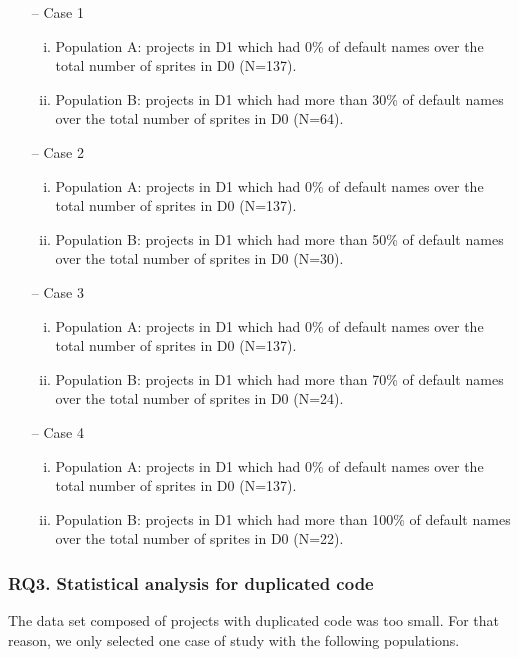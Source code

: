 \begin{itemize}
    \item[--] Case 1
    \begin{enumerate}[(i)]
        \item Population A: projects in D1 which had 0\% of default names over the total number of sprites in D0 (N=137).
        \item Population B: projects in D1 which had more than 30\% of default names over the total number of sprites  in D0 (N=64).
    \end{enumerate}
    \item[--] Case 2
    \begin{enumerate}[(i)]
        \item Population A: projects in D1 which had 0\% of default names over the total number of sprites in D0 (N=137).
        \item Population B: projects in D1 which had more than 50\% of default names over the total number of sprites  in D0 (N=30).
    \end{enumerate}
    \item[--] Case 3
    \begin{enumerate}[(i)]
        \item Population A: projects in D1 which had 0\% of default names over the total number of sprites in D0 (N=137).
        \item Population B: projects in D1 which had more than 70\% of default names over the total number of sprites  in D0 (N=24).
    \end{enumerate}
    \item[--] Case 4
    \begin{enumerate}[(i)]
        \item Population A: projects in D1 which had 0\% of default names over the total number of sprites in D0 (N=137).
        \item Population B: projects in D1 which had more than 100\% of default names over the total number of sprites in D0 (N=22).
    \end{enumerate}
\end{itemize}


\subsubsection{RQ3. Statistical analysis for duplicated code}
\label{subsubsec:RQ3_statistical}

The data set composed of projects with duplicated code was too small. For that reason, we only selected one case of study with the following populations. 

